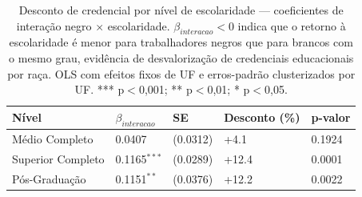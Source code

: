\begin{table}
\caption{Desconto de credencial por nível de escolaridade — coeficientes de interação negro $\times$ escolaridade. $\beta_{interacao} < 0$ indica que o retorno à escolaridade é menor para trabalhadores negros que para brancos com o mesmo grau, evidência de desvalorização de credenciais educacionais por raça. OLS com efeitos fixos de UF e erros-padrão clusterizados por UF. *** p$<$0,001; ** p$<$0,01; * p$<$0,05.}
\label{tab:interacao_escolaridade}
\begin{tabular}{lllll}
\toprule
Nível & $\beta_{interacao}$ & SE & Desconto (\%) & p-valor \\
\midrule
Médio Completo & 0.0407 & (0.0312) & +4.1 & 0.1924 \\
Superior Completo & 0.1165$^{***}$ & (0.0289) & +12.4 & 0.0001 \\
Pós-Graduação & 0.1151$^{**}$ & (0.0376) & +12.2 & 0.0022 \\
\bottomrule
\end{tabular}
\end{table}
